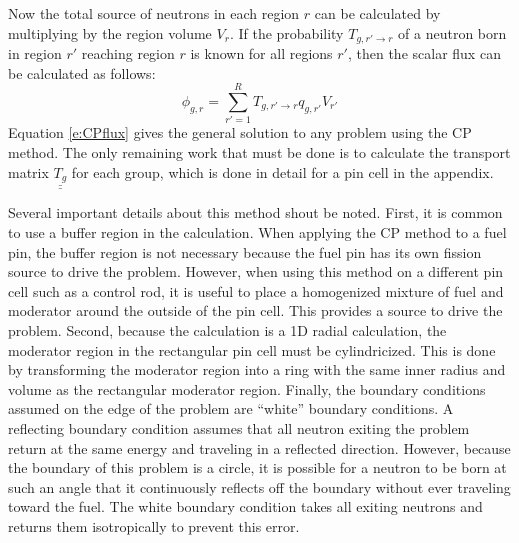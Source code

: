 Now the total source of neutrons in each region $r$ can be calculated by multiplying by the region volume $V_r$.  If the probability $T_{g,r'\rightarrow r}$ of a neutron born in region $r'$ reaching region $r$ is known for all regions $r'$, then the scalar flux can be calculated as follows:
\begin{equation}\label{e:CPflux}
\phi_{g,r} = \sum_{r'=1}^R T_{g,r'\rightarrow r} q_{g,r'} V_{r'}
\end{equation}
Equation \ref{e:CPflux} gives the general solution to any problem using the CP method.  The only remaining work that must be done is to calculate the transport matrix $\underline{\underline{T_g}}$ for each group, which is done in detail for a pin cell in the appendix.

Several important details about this method shout be noted.  First, it is common to use a buffer region in the calculation.  When applying the CP method to a fuel pin, the buffer region is not necessary because the fuel pin has its own fission source to drive the problem.  However, when using this method on a different pin cell such as a control rod, it is useful to place a homogenized mixture of fuel and moderator around the outside of the pin cell.  This provides a source to drive the problem.  Second, because the calculation is a 1D radial calculation, the moderator region in the rectangular pin cell must be cylindricized.  This is done by transforming the moderator region into a ring with the same inner radius and volume as the rectangular moderator region.  Finally, the boundary conditions assumed on the edge of the problem are ``white'' boundary conditions.  A reflecting boundary condition assumes that all neutron exiting the problem return at the same energy and traveling in a reflected direction.  However, because the boundary of this problem is a circle, it is possible for a neutron to be born at such an angle that it continuously reflects off the boundary without ever traveling toward the fuel.  The white boundary condition takes all exiting neutrons and returns them isotropically to prevent this error.